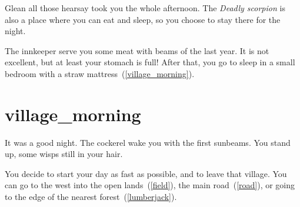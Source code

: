 Glean all those hearsay took you the whole afternoon. The \textit{Deadly
scorpion} is also a place where you can eat and sleep, so you choose to stay
there for the night.

The innkeeper serve you some meat with beams of the last year. It is not
excellent, but at least your stomach is full! After that, you go to sleep in a
small bedroom with a straw mattress~(\ref{village_morning}).

\section{village_morning}

It was a good night. The cockerel wake you with the first sunbeams. You stand
up, some wisps still in your hair.

You decide to start your day as fast as possible, and to leave that village.
You can go to the west into the open lands~(\ref{field}), the main
road~(\ref{road}), or going to the edge of the nearest
forest~(\ref{lumberjack}).

